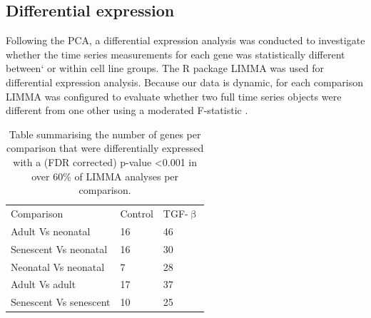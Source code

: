 \documentclass[alpha-refs]{wiley-article}
\newcommand{\tgf}{TGF-$\upbeta$}
\begin{document}
\subsection{Differential expression}
Following the PCA, a differential expression analysis was conducted to investigate whether the time series measurements for each gene was statistically different between` or within cell line groups. The R package LIMMA was used for differential expression analysis. Because our data is dynamic, for each comparison LIMMA was configured to evaluate whether two full time series objects were different from one other using a moderated F-statistic \citep{Ritchie2015, Smyth2004, Smyth2005}. 
\begin{table}[h]
	\centering
	\caption{Table summarising the number of genes per comparison that were differentially expressed with a (FDR corrected) p-value <0.001 in over 60\% of LIMMA analyses per comparison.}
	\begin{tabular}{lll}
		Comparison & Control & \tgf{} \\
		Adult Vs neonatal & 16 & 46 \\
		Senescent Vs neonatal & 16 & 30 \\
		Neonatal Vs neonatal & 7 & 28 \\
		Adult Vs adult & 17 & 37 \\
		Senescent Vs senescent & 10 & 25
	\end{tabular}
	\label{table:stats_summary}
\end{table}
\end{document}
